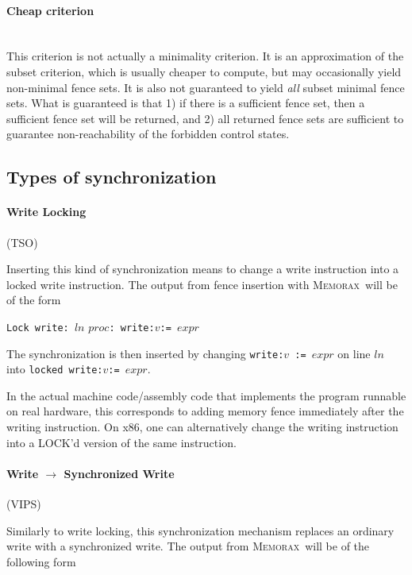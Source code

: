 \documentclass[a4paper]{article}
\newcommand{\memorax}{\textsc{Memorax}}
\begin{document}
\paragraph{Cheap criterion}\mbox{}\\
%
This criterion is not actually a minimality criterion. It is an
approximation of the subset criterion, which is usually cheaper to
compute, but may occasionally yield non-minimal fence sets. It is also
not guaranteed to yield {\em all} subset minimal fence sets. What is
guaranteed is that 1) if there is a sufficient fence set, then a
sufficient fence set will be returned, and 2) all returned fence sets
are sufficient to guarantee non-reachability of the forbidden control
states.

\subsection{Types of synchronization}\label{sec:sync:types}

\paragraph{Write Locking}\hfill(TSO)

Inserting this kind of synchronization means to change a write
instruction into a locked write instruction. The output from fence
insertion with \memorax\ will be of the form

\vspace{10pt}

\noindent
{\tt Lock write: }$ln$ $proc${\tt : write:}$v${\tt := }$expr$

\vspace{10pt}

The synchronization is then inserted by changing {\tt write:}$v${\tt
  := }$expr$ on line $ln$ into {\tt locked write:}$v${\tt := }$expr$.

In the actual machine code/assembly code that implements the program
runnable on real hardware, this corresponds to adding memory fence
immediately after the writing instruction. On x86, one can
alternatively change the writing instruction into a LOCK'd version of
the same instruction.

\paragraph{Write $\rightarrow$ Synchronized Write}\hfill(VIPS)

Similarly to write locking, this synchronization mechanism replaces an
ordinary write with a synchronized write. The output from
\memorax\ will be of the following form
\end{document}
